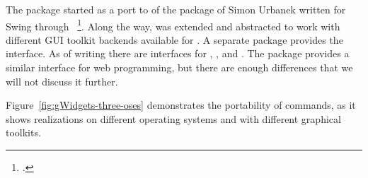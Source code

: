 
The  package started as a port to  of the
 package of Simon Urbanek written for Swing through
~\footcite{iWidgets}. Along the way,  was
extended and abstracted to work with different GUI toolkit backends
available for \R. A separate package provides the interface. As of
writing there are interfaces for , , and
. The  package provides a similar
interface for web programming, but there are enough differences that
we will not discuss it further.

Figure~\ref{fig:gWidgets-three-oses} demonstrates the portability of
 commands, as it shows realizations on different
operating systems and with different graphical toolkits.

